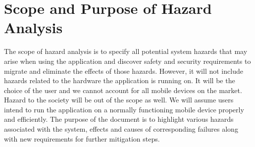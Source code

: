 \documentclass{article}
\begin{document}
\section{Scope and Purpose of Hazard Analysis}

The scope of hazard analysis is to specify all potential system hazards that may arise when using the application and discover safety and security requirements to migrate and eliminate the effects of those hazards. However, it will not include hazards related to the hardware the application is running on. It will be the choice of the user and we cannot account for all mobile devices on the market. Hazard to the society will be out of the scope as well. We will assume users intend to run the application on a normally functioning mobile device properly and efficiently. The purpose of the document is to highlight various hazards associated with the system, effects and causes of corresponding failures along with new requirements for further mitigation steps.
\end{document}
